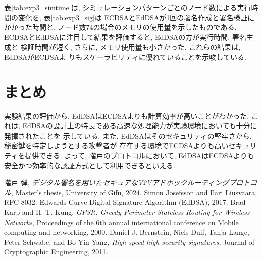 \documentclass[a4j,9pt,twocolumn]{jsarticle}
\begin{document}
表\ref{tab:exp3_simtime}は, シミュレーションパターンごとのノード数による実行時間の変化を, 
表\ref{tab:exp3_sig}は ECDSAとEdDSAが1回の署名作成と署名検証にかかった時間と, 
ノード数74の場合のメモリの使用量を示したものである. 
\indent ECDSAとEdDSAに注目して結果を評価すると, EdDSAの方が実行時間, 署名生成と
検証時間が短く, さらに, メモリ使用量も小さかった. これらの結果は, EdDSAがECDSAよ
りもスケーラビリティに優れていることを示唆している. 

\section{まとめ}
\indent 実験結果の評価から, EdDSAはECDSAよりも計算効率が高いことがわかった. 
これは, EdDSAの設計上の特長である高速な処理能力が実験環境においても十分に発揮されたことを
示している. また, EdDSAはそのセキュリティの堅牢さから, 秘密鍵を特定しようとする攻撃者が
存在する環境でECDSAよりも高いセキュリティを提供できる. よって, 階戸のプロトコルにおいて, 
EdDSAはECDSAよりも安全かつ効率的な認証方式として利用できるといえる. 



\noindent\hrulefill %
\begin{thebibliography}{99}
     階戸 弾,
        \textit{デジタル署名を用いたセキュアなV2Vアドホックルーティングプロトコル},
        Master's thesis, University of Gifu, 2024.
     Simon Josefsson and Ilari Liusvaara, 
        RFC 8032: Edwards-Curve Digital Signature Algorithm (EdDSA), 2017.
     Brad Karp and H. T. Kung, 
        \textit{GPSR: Greedy Perimeter Stateless Routing for Wireless Networks},
        Proceedings of the 6th annual international conference on Mobile computing and networking, 2000.
     Daniel J. Bernstein, Niels Duif, Tanja Lange, Peter Schwabe, and Bo-Yin Yang,
        \textit{High-speed high-security signatures}, Journal of Cryptographic Engineering, 2011.
\end{thebibliography}

\end{document}
